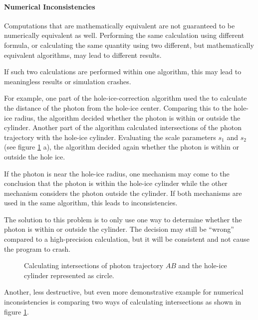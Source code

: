 
\paragraph{Numerical Inconsistencies}

Computations that are mathematically equivalent are not guaranteed to be
numerically equivalent as well. Performing the same calculation using
different formula, or calculating the same quantity using two different,
but mathematically equivalent algorithms, may lead to different results.

If such two calculations are performed within one algorithm, this may
lead to meaningless results or simulation crashes.

For example, one part of the hole-ice-correction algorithm used the
 to calculate the distance of the photon from
the hole-ice center. Comparing this to the hole-ice radius, the
algorithm decided whether the photon is within or outside the cylinder.
Another part of the algorithm calculated intersections of the photon
trajectory with the hole-ice cylinder. Evaluating the scale parameters
\(s_1\) and \(s_2\) (see figure \ref{fig:aeQuae2U} a), the algorithm
decided again whether the photon is within or outside the hole ice.

If the photon is near the hole-ice radius, one mechanism may come to the
conclusion that the photon is within the hole-ice cylinder while the
other mechanism considers the photon outside the cylinder. If both
mechanisms are used in the same algorithm, this leads to
inconsistencies.

The solution to this problem is to only use one way to determine whether
the photon is within or outside the cylinder. The decision may still be
``wrong'' compared to a high-precision calculation, but it will be
consistent and not cause the program to crash.

\begin{figure}[htbp]
  \caption{Calculating intersections of photon trajectory $AB$ and the hole-ice cylinder represented as circle.}
  \label{fig:aeQuae2U}
\end{figure}

Another, less destructive, but even more demonstrative example for
numerical inconsistencies is comparing two ways of calculating
intersections as shown in figure \ref{fig:aeQuae2U}.

